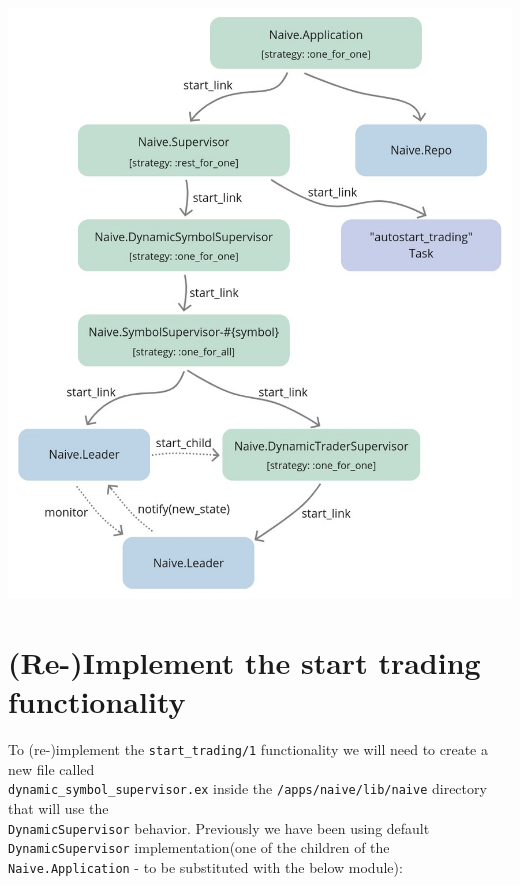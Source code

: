 \documentclass[
  oneside]{book}
\begin{document}
\begin{center}\includegraphics[width=1\linewidth,height=0.5\textheight]{images/chapter_12_02_sup_diagram} \end{center}

\section{(Re-)Implement the start trading functionality}\label{re-implement-the-start-trading-functionality}

To (re-)implement the \texttt{start\_trading/1} functionality we will need to create a new file called\\
\texttt{dynamic\_symbol\_supervisor.ex} inside the \texttt{/apps/naive/lib/naive} directory that will use the\\
\texttt{DynamicSupervisor} behavior. Previously we have been using default \texttt{DynamicSupervisor} implementation(one of the children of the \texttt{Naive.Application} - to be substituted with the below module):
\end{document}
